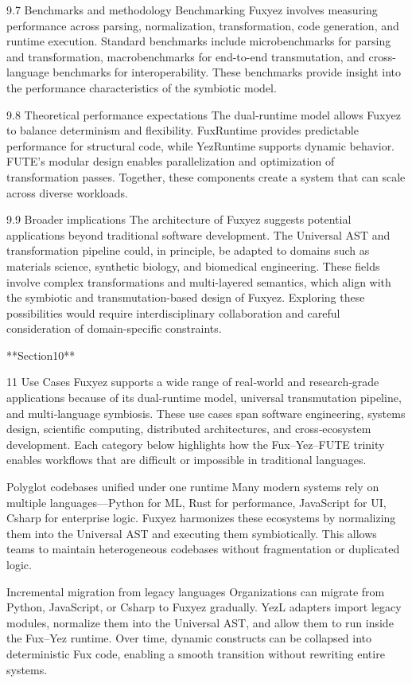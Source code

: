 9.7 Benchmarks and methodology
Benchmarking Fuxyez involves measuring performance across parsing, normalization, transformation, code generation, and runtime execution. Standard benchmarks include microbenchmarks for parsing and transformation, macrobenchmarks for end-to-end transmutation, and cross-language benchmarks for interoperability. These benchmarks provide insight into the performance characteristics of the symbiotic model.

9.8 Theoretical performance expectations
The dual‑runtime model allows Fuxyez to balance determinism and flexibility. FuxRuntime provides predictable performance for structural code, while YezRuntime supports dynamic behavior. FUTE’s modular design enables parallelization and optimization of transformation passes. Together, these components create a system that can scale across diverse workloads.

9.9 Broader implications
The architecture of Fuxyez suggests potential applications beyond traditional software development. The Universal AST and transformation pipeline could, in principle, be adapted to domains such as materials science, synthetic biology, and biomedical engineering. These fields involve complex transformations and multi-layered semantics, which align with the symbiotic and transmutation-based design of Fuxyez. Exploring these possibilities would require interdisciplinary collaboration and careful consideration of domain-specific constraints.

**Section10**

11 Use Cases
Fuxyez supports a wide range of real‑world and research‑grade applications because of its dual‑runtime model, universal transmutation pipeline, and multi‑language symbiosis. These use cases span software engineering, systems design, scientific computing, distributed architectures, and cross‑ecosystem development. Each category below highlights how the Fux–Yez–FUTE trinity enables workflows that are difficult or impossible in traditional languages.

Polyglot codebases unified under one runtime
Many modern systems rely on multiple languages—Python for ML, Rust for performance, JavaScript for UI, Csharp for enterprise logic. Fuxyez harmonizes these ecosystems by normalizing them into the Universal AST and executing them symbiotically. This allows teams to maintain heterogeneous codebases without fragmentation or duplicated logic.

Incremental migration from legacy languages
Organizations can migrate from Python, JavaScript, or Csharp to Fuxyez gradually. YezL adapters import legacy modules, normalize them into the Universal AST, and allow them to run inside the Fux–Yez runtime. Over time, dynamic constructs can be collapsed into deterministic Fux code, enabling a smooth transition without rewriting entire systems.

